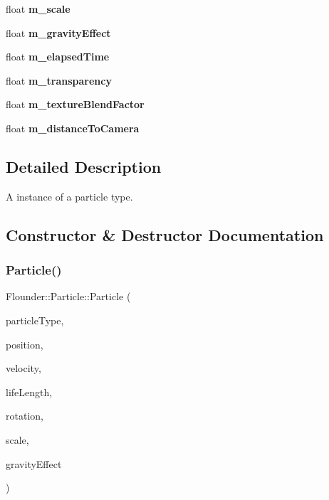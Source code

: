 \begin{DoxyCompactItemize}
float {\bfseries m\+\_\+scale}
\item 
\mbox{\label{class_flounder_1_1_particle_a95905590405d77c59f683765e9fd0af8}} 
float {\bfseries m\+\_\+gravity\+Effect}
\item 
\mbox{\label{class_flounder_1_1_particle_a5248a7c0f52eafd9a8e41900e508a4ae}} 
float {\bfseries m\+\_\+elapsed\+Time}
\item 
\mbox{\label{class_flounder_1_1_particle_ac1ed6e74f63e9075a2b14fa1a574af02}} 
float {\bfseries m\+\_\+transparency}
\item 
\mbox{\label{class_flounder_1_1_particle_a8b06a9026c70ef257d13e4a03db1c1f8}} 
float {\bfseries m\+\_\+texture\+Blend\+Factor}
\item 
\mbox{\label{class_flounder_1_1_particle_a62c15670eecec94a1eeac53d5ec52f70}} 
float {\bfseries m\+\_\+distance\+To\+Camera}
\end{DoxyCompactItemize}


\subsection{Detailed Description}
A instance of a particle type. 



\subsection{Constructor \& Destructor Documentation}
\mbox{\label{class_flounder_1_1_particle_a35ce43438b08e611f3c9d7e6c5e60956}} 
\subsubsection{\texorpdfstring{Particle()}{Particle()}}
{\footnotesize\ttfamily Flounder\+::\+Particle\+::\+Particle (\begin{DoxyParamCaption}\item[{\hyperlink{class_flounder_1_1_particle_type}{Particle\+Type} $\ast$}]{particle\+Type,  }\item[{const \hyperlink{class_flounder_1_1_vector3}{Vector3} \&}]{position,  }\item[{const \hyperlink{class_flounder_1_1_vector3}{Vector3} \&}]{velocity,  }\item[{const float \&}]{life\+Length,  }\item[{const float \&}]{rotation,  }\item[{const float \&}]{scale,  }\item[{const float \&}]{gravity\+Effect }\end{DoxyParamCaption})}



